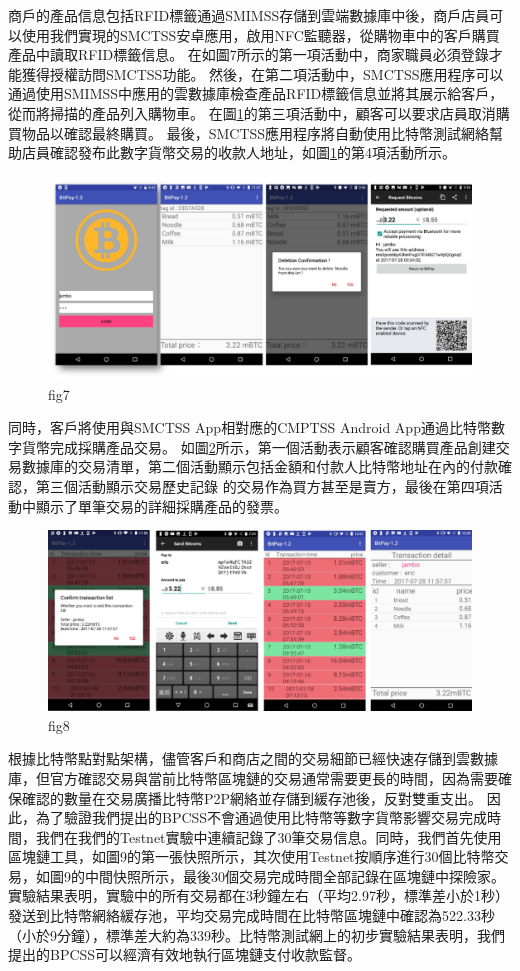 商戶的產品信息包括RFID標籤通過SMIMSS存儲到雲端數據庫中後，商戶店員可以使用我們實現的SMCTSS安卓應用，啟用NFC監聽器，從購物車中的客戶購買產品中讀取RFID標籤信息。 在如圖7所示的第一項活動中，商家職員必須登錄才能獲得授權訪問SMCTSS功能。 然後，在第二項活動中，SMCTSS應用程序可以通過使用SMIMSS中應用的雲數據庫檢查產品RFID標籤信息並將其展示給客戶，從而將掃描的產品列入購物車。 在圖\ref{fig7}的第三項活動中，顧客可以要求店員取消購買物品以確認最終購買。 最後，SMCTSS應用程序將自動使用比特幣測試網絡幫助店員確認發布此數字貨幣交易的收款人地址，如圖\ref{fig7}的第4項活動所示。    
\begin{figure}[h]
	\centering
	\includegraphics[width = 1\textwidth]{fig7.png}
	\caption{fig7}\label{fig7}
\end{figure}
同時，客戶將使用與SMCTSS App相對應的CMPTSS Android App通過比特幣數字貨幣完成採購產品交易。 如圖\ref{fig8}所示，第一個活動表示顧客確認購買產品創建交易數據庫的交易清單，第二個活動顯示包括金額和付款人比特幣地址在內的付款確認，第三個活動顯示交易歷史記錄 的交易作為買方甚至是賣方，最後在第四項活動中顯示了單筆交易的詳細採購產品的發票。    
\begin{figure}[h]
	\centering
	\includegraphics[width = 1\textwidth]{fig8.png}
	\caption{fig8}\label{fig8}
\end{figure}

根據比特幣點對點架構，儘管客戶和商店之間的交易細節已經快速存儲到雲數據庫，但官方確認交易與當前比特幣區塊鏈的交易通常需要更長的時間，因為需要確保確認的數量在交易廣播比特幣P2P網絡並存儲到緩存池後，反對雙重支出。
因此，為了驗證我們提出的BPCSS不會通過使用比特幣等數字貨幣影響交易完成時間，我們在我們的Testnet實驗中連續記錄了30筆交易信息。同時，我們首先使用區塊鏈工具，如圖9的第一張快照所示，其次使用Testnet按順序進行30個比特幣交易，如圖9的中間快照所示，最後30個交易完成時間全部記錄在區塊鏈中探險家。實驗結果表明，實驗中的所有交易都在3秒鐘左右（平均2.97秒，標準差小於1秒）發送到比特幣網絡緩存池，平均交易完成時間在比特幣區塊鏈中確認為522.33秒（小於9分鐘），標準差大約為339秒。比特幣測試網上的初步實驗結果表明，我們提出的BPCSS可以經濟有效地執行區塊鏈支付收款監督。    
